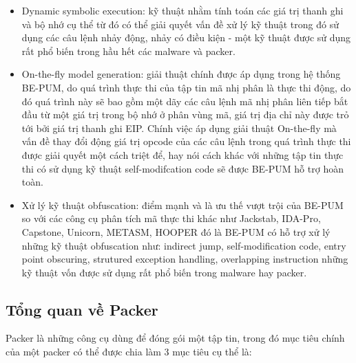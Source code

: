 \begin{itemize}
\item{Dynamic symbolic execution: kỹ thuật nhằm tính toán các giá trị thanh ghi và bộ nhớ cụ thể từ đó có thể giải quyết vấn đề xử lý kỹ thuật trong đó sử dụng các câu lệnh nhảy động, nhảy có điều kiện - một kỹ thuật được sử dụng rất phổ biến trong hầu hết các malware và packer.\\}
\item{On-the-fly model generation: giải thuật chính được áp dụng trong hệ thống BE-PUM, do quá trình thực thi của tập tin mã nhị phân là thực thi động, do đó quá trình này sẽ bao gồm một dãy các câu lệnh mã nhị phân liên tiếp bắt đầu từ một giá trị trong bộ nhớ ở phân vùng mã, giá trị địa chỉ này được trỏ tới bởi giá trị thanh ghi EIP. Chính việc áp dụng giải thuật On-the-fly mà vấn đề thay đổi động giá trị opcode của các câu lệnh trong quá trình thực thi được giải quyết một cách triệt để, hay nói cách khác với những tập tin thực thi có sử dụng kỹ thuật self-modifcation code sẽ được BE-PUM hỗ trợ hoàn toàn.\\}
\item{Xử lý kỹ thuật obfuscation: điểm mạnh và là ưu thế vượt trội của BE-PUM so với các công cụ phân tích mã thực thi khác như Jackstab, IDA-Pro, Capstone, Unicorn, METASM, HOOPER đó là BE-PUM có hỗ trợ xử lý những kỹ thuật obfuscation như: indirect jump, self-modification code, entry point obscuring, strutured exception handling, overlapping instruction những kỹ thuật vốn được sử dụng rất phổ biến trong malware hay packer.}
\end{itemize}

\subsection{Tổng quan về Packer}

\hspace{0.5cm}Packer là những công cụ dùng để đóng gói một tập tin, trong đó mục tiêu chính của một packer có thể được chia làm 3 mục tiêu cụ thể là:

